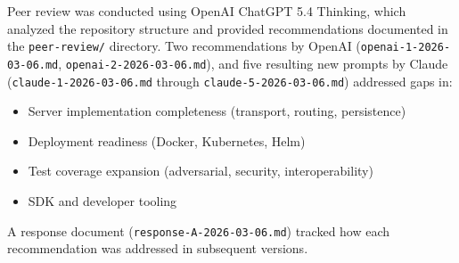 \documentclass{article}
\begin{document}
Peer review was conducted using OpenAI ChatGPT 5.4 Thinking, which analyzed the repository structure and provided recommendations documented in the \texttt{peer-review/} directory. Two recommendations by OpenAI (\texttt{openai-1-2026-03-06.md}, \texttt{openai-2-2026-03-06.md}), and five resulting new prompts by Claude (\texttt{claude-1-2026-03-06.md} through \texttt{claude-5-2026-03-06.md}) addressed gaps in:

\begin{itemize}[leftmargin=*]
\item Server implementation completeness (transport, routing, persistence)
\item Deployment readiness (Docker, Kubernetes, Helm)
\item Test coverage expansion (adversarial, security, interoperability)
\item SDK and developer tooling
\end{itemize}

A response document (\texttt{response-A-2026-03-06.md}) tracked how each recommendation was addressed in subsequent versions.

\end{document}

